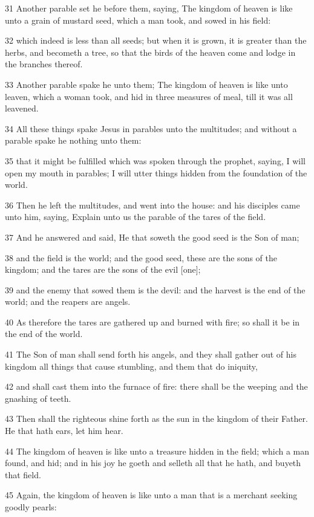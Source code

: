 \par 31 Another parable set he before them, saying, The kingdom of heaven is like unto a grain of mustard seed, which a man took, and sowed in his field:
\par 32 which indeed is less than all seeds; but when it is grown, it is greater than the herbs, and becometh a tree, so that the birds of the heaven come and lodge in the branches thereof.
\par 33 Another parable spake he unto them; The kingdom of heaven is like unto leaven, which a woman took, and hid in three measures of meal, till it was all leavened.
\par 34 All these things spake Jesus in parables unto the multitudes; and without a parable spake he nothing unto them:
\par 35 that it might be fulfilled which was spoken through the prophet, saying, I will open my mouth in parables; I will utter things hidden from the foundation of the world.
\par 36 Then he left the multitudes, and went into the house: and his disciples came unto him, saying, Explain unto us the parable of the tares of the field.
\par 37 And he answered and said, He that soweth the good seed is the Son of man;
\par 38 and the field is the world; and the good seed, these are the sons of the kingdom; and the tares are the sons of the evil [one];
\par 39 and the enemy that sowed them is the devil: and the harvest is the end of the world; and the reapers are angels.
\par 40 As therefore the tares are gathered up and burned with fire; so shall it be in the end of the world.
\par 41 The Son of man shall send forth his angels, and they shall gather out of his kingdom all things that cause stumbling, and them that do iniquity,
\par 42 and shall cast them into the furnace of fire: there shall be the weeping and the gnashing of teeth.
\par 43 Then shall the righteous shine forth as the sun in the kingdom of their Father. He that hath ears, let him hear.
\par 44 The kingdom of heaven is like unto a treasure hidden in the field; which a man found, and hid; and in his joy he goeth and selleth all that he hath, and buyeth that field.
\par 45 Again, the kingdom of heaven is like unto a man that is a merchant seeking goodly pearls:
